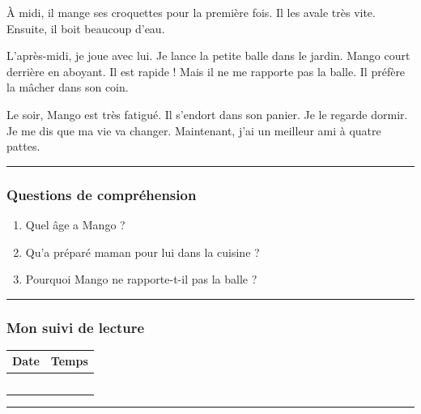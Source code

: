 \documentclass[
  french,
  14pt,
  a4paper,
]{extarticle}
\providecommand{\tightlist}{%
  \setlength{\itemsep}{0pt}\setlength{\parskip}{0pt}}
\begin{document}
À midi, il mange ses croquettes pour la première fois. Il les avale
très vite. Ensuite, il boit beaucoup d'eau.

L'après-midi, je joue avec lui. Je lance la petite balle dans le jardin.
Mango court derrière en aboyant. Il est rapide ! Mais il ne me rapporte
pas la balle. Il préfère la mâcher dans son coin.

Le soir, Mango est très fatigué. Il s'endort dans son panier. Je le
regarde dormir. Je me dis que ma vie va changer. Maintenant, j'ai un
meilleur ami à quatre pattes.

\begin{center}\rule{0.5\linewidth}{0.5pt}\end{center}

\subsubsection{Questions de
compréhension}\label{questions-de-compruxe9hension-6}

\begin{enumerate}
\def\labelenumi{\arabic{enumi}.}
\tightlist
\item
  Quel âge a Mango ?
\item
  Qu'a préparé maman pour lui dans la cuisine ?
\item
  Pourquoi Mango ne rapporte-t-il pas la balle ?
\end{enumerate}

\begin{center}\rule{0.5\linewidth}{0.5pt}\end{center}

\subsubsection{Mon suivi de lecture}\label{mon-suivi-de-lecture-6}

\begin{center}
\begin{tabularx}{0.75\textwidth}{|X|X|}
\hline
\textbf{Date} & \textbf{Temps} \\
\hline
& \\
\hline
& \\
\hline
& \\
\hline
& \\
\hline
& \\
\hline
\end{tabularx}
\end{center}

\begin{center}\rule{0.5\linewidth}{0.5pt}\end{center}
\end{document}
